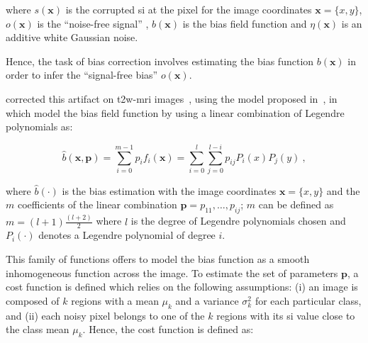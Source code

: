 \noindent where $s(\mathbf{x})$ is the corrupted \ac{si} at the pixel for the image coordinates $\mathbf{x} = \{x,y\}$, $o(\mathbf{x})$ is the ``noise-free signal'' , $b(\mathbf{x})$ is the bias field function and $\eta(\mathbf{x})$ is an additive white Gaussian noise.
%
%
%

Hence, the task of bias correction involves estimating the bias function $b(\mathbf{x})$ in order to infer the ``signal-free bias'' $o(\mathbf{x})$.


\citeauthor{Viswanath2009} corrected this artifact on \ac{t2w}-\ac{mri} images~\cite{Viswanath2009}, using the model proposed in~\cite{Styner2000}, in which \citeauthor{Styner2000} model the bias field function by using a linear combination of Legendre polynomials as:

\begin{equation}
	\hat{b}(\mathbf{x},\mathbf{p}) = \sum_{i=0}^{m-1} p_i f_i(\mathbf{x}) =  \sum_{i=0}^{l} \sum_{j=0}^{l-i} p_{ij} P_i(x) P_j(y) \ ,
	\label{eq:biascorr}
\end{equation}

\noindent where $\hat{b}(\cdot)$ is the bias estimation with the image coordinates $\mathbf{x} = \{x,y\}$ and the $m$ coefficients of the linear combination $\mathbf{p} = {p_{11},\dotsc,p_{ij}}$; $m$ can be defined as $m=(l+1)\frac{(l+2)}{2}$ where $l$ is the degree of Legendre polynomials chosen and $P_i(\cdot)$ denotes a Legendre polynomial of degree $i$.

This family of functions offers to model the bias function as a smooth inhomogeneous function across the image.
To estimate the set of parameters $\mathbf{p}$, a cost function is defined which relies on the following assumptions: (i) an image is composed of $k$ regions with a mean $\mu_k$ and a variance $\sigma^{2}_{k}$ for each particular class, and (ii) each noisy pixel belongs to one of the $k$ regions with its \ac{si} value close to the class mean $\mu_k$.
Hence, the cost function is defined as:

